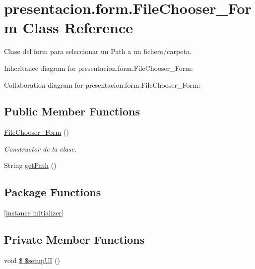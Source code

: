 \hypertarget{classpresentacion_1_1form_1_1FileChooser__Form}{}\section{presentacion.\+form.\+File\+Chooser\+\_\+\+Form Class Reference}
\label{classpresentacion_1_1form_1_1FileChooser__Form}


Clase del form para seleccionar un Path a un fichero/carpeta.  




Inheritance diagram for presentacion.\+form.\+File\+Chooser\+\_\+\+Form\+:


Collaboration diagram for presentacion.\+form.\+File\+Chooser\+\_\+\+Form\+:
\subsection*{Public Member Functions}
\begin{DoxyCompactItemize}
\item 
\hyperlink{classpresentacion_1_1form_1_1FileChooser__Form_abcd4d671f55d23cf9e0f2488a80b62cb}{File\+Chooser\+\_\+\+Form} ()
\begin{DoxyCompactList}\small\item\em Constructor de la clase. \end{DoxyCompactList}\item 
String \hyperlink{classpresentacion_1_1form_1_1FileChooser__Form_a599510439b2d28102d3b34f589919500}{get\+Path} ()
\end{DoxyCompactItemize}
\subsection*{Package Functions}
\begin{DoxyCompactItemize}
\item 
\hyperlink{classpresentacion_1_1form_1_1FileChooser__Form_a8d945fc06608ce6b2d4e49318b9c7b41}{\mbox{[}instance initializer\mbox{]}}
\end{DoxyCompactItemize}
\subsection*{Private Member Functions}
\begin{DoxyCompactItemize}
\item 
void \hyperlink{classpresentacion_1_1form_1_1FileChooser__Form_ab96ac21c9d7b860368a206f36f6ec4fb}{\$ \$setup\+UI} ()
\end{DoxyCompactItemize}

